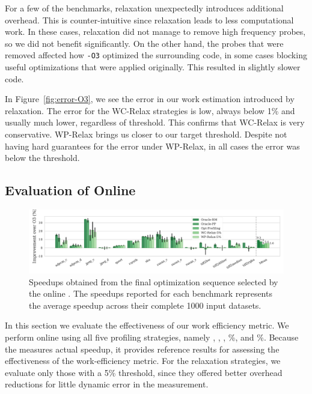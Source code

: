 For a few of the benchmarks, relaxation unexpectedly introduces additional overhead. This is counter-intuitive since relaxation leads to
less computational work. In these cases, relaxation did not manage to remove high frequency probes, so we did not benefit significantly.
On the other hand, the probes that were removed affected how \texttt{-O3} optimized the surrounding code, in some cases blocking useful
optimizations that were applied originally. This resulted in slightly slower code.

In Figure~\ref{fig:error-O3}, we see the error in our work estimation introduced by relaxation. The error for the WC-Relax strategies is low, always below 1\% and usually much lower, regardless of threshold. This confirms that WC-Relax is very conservative. WP-Relax brings
us closer to our target threshold. Despite not having hard guarantees for the error under WP-Relax, in all cases the error was below the
threshold.

\subsection{Evaluation of Online {\IterComp}}

\begin{figure}[t]
    \centering
    \includegraphics[width=\textwidth]{figs/speedups.pdf}
    \caption{Speedups obtained from the final optimization sequence selected by the online {\itercomp}.
	         The speedups reported for each benchmark represents the average speedup across their complete 1000 input datasets.}
    \label{fig:speedups}
\end{figure}

In this section we evaluate the effectiveness of our work efficiency metric.
We perform online {\itercomp} using all five profiling strategies, namely
\OracleRM, \OraclePP, \OptProf, \%, and \%.
Because the \OracleRM measures actual speedup, it provides reference results for
assessing the effectiveness of the work-efficiency metric.
For the relaxation strategies, we evaluate only those with a 5\% threshold, since
they offered better overhead reductions for little dynamic error in the measurement.


